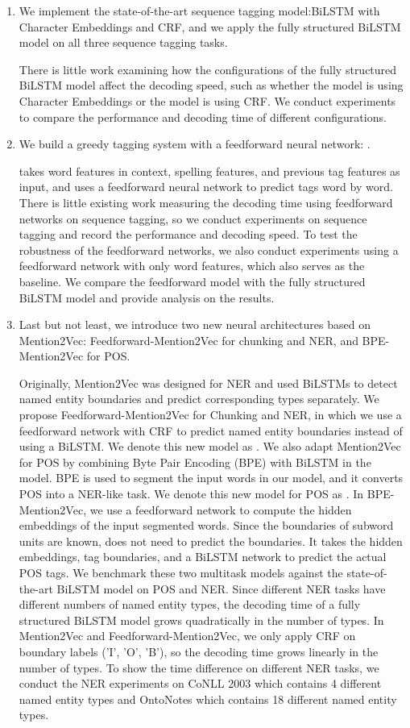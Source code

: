 \begin{enumerate}

\item  We implement the state-of-the-art sequence tagging model:BiLSTM with Character Embeddings and CRF, and we apply the fully structured BiLSTM model on all three sequence tagging tasks.

There is little work examining how the configurations of the fully structured BiLSTM model affect the decoding speed, such as whether the model is using Character Embeddings or the model is using CRF. We conduct experiments to compare the performance and decoding time of different configurations. 

\item We build a greedy tagging system with a feedforward neural network: \ffa. 

\ffa{} takes word features in context, spelling features, and previous tag features as input, and uses a feedforward neural network to predict tags word by word. There is little existing work measuring the decoding time using feedforward networks on sequence tagging, so we conduct experiments on sequence tagging and record the performance and decoding speed. To test the robustness of the feedforward networks, we also conduct experiments using a feedforward network with only word features, which also serves as the baseline. We compare the  feedforward model with the fully structured BiLSTM model and provide analysis on the results. 


\item Last but not least, we introduce two new neural architectures based on Mention2Vec: Feedforward-Mention2Vec for chunking and NER, and BPE-Mention2Vec for POS. 

Originally, Mention2Vec was designed for NER and used BiLSTMs to detect named entity boundaries and predict corresponding types separately. We propose Feedforward-Mention2Vec for Chunking and NER, in which we use a feedforward network with CRF to predict named entity boundaries instead of using a BiLSTM.  We denote this new model as \ma. We also adapt Mention2Vec for POS by combining Byte Pair Encoding (BPE) with BiLSTM in the model. BPE is used to segment the input words in our model, and it converts POS into a NER-like task. We denote this new model for POS as \mb. In BPE-Mention2Vec, we use a feedforward network to compute the hidden embeddings of the input segmented words. Since the boundaries of subword units are known, \mb{} does not need to predict the boundaries. It takes the hidden embeddings, tag boundaries, and a BiLSTM network to predict the actual POS tags. We benchmark these two multitask models against the state-of-the-art BiLSTM model on POS and NER. Since different NER tasks have different numbers of named entity types, the decoding time of a fully structured BiLSTM model grows quadratically in the number of types. In Mention2Vec and Feedforward-Mention2Vec, we only apply CRF on boundary labels ('I', 'O', 'B'), so the decoding time grows linearly in the number of types. To show the time difference on different NER tasks, we conduct the NER experiments on CoNLL 2003 which contains 4 different named entity types and OntoNotes which contains 18 different named entity types.


\end{enumerate}
